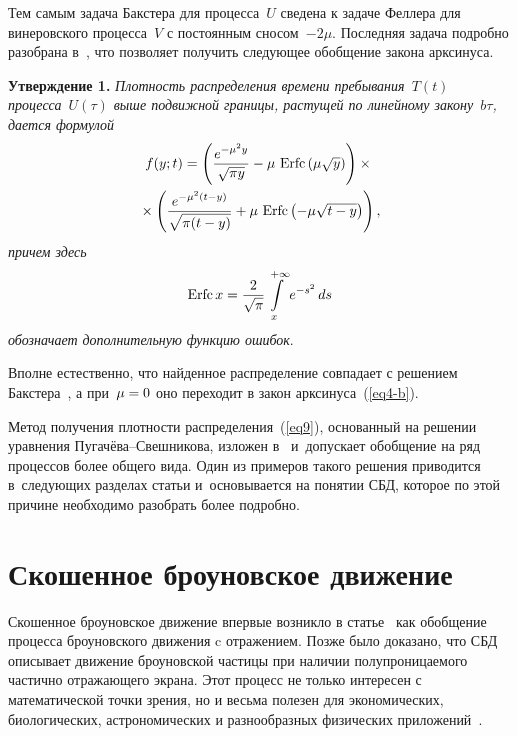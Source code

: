 \begin{multicols}{2}
Тем самым задача Бакстера для процесса~$U$ сведена к задаче Феллера для винеровского процесса~$V$ с постоянным сносом~$-2 \mu$. Последняя задача подробно разобрана в~\cite{ref17}, что позволяет получить следующее обобщение закона арксинуса.

\smallskip

\noindent
\textbf{Утверждение 1.}
\textit{Плотность распределения времени пребывания~$T(t)$ процесса~$U(\tau)$ выше подвижной границы, растущей по линейному закону~$b \tau$, дается формулой
  \begin{multline}
    \label{eq9}
    f(y;t) = \left( \displaystyle\frac{\displaystyle e^{-\mu^2 y}\mathstrut}{\displaystyle \sqrt{\pi y}\mathstrut} - \mu\ \mathrm{Erfc}\left(\mu \sqrt{y}\right) \right)\times{}\\
     {}\times\left( \displaystyle\frac{\displaystyle e^{-\mu^2 (t-y)}\mathstrut}{\displaystyle \sqrt{\pi (t-y)}\mathstrut} + \mu\ \mathrm{Erfc}\left(-\mu \sqrt{t-y}\right) \right),
  \end{multline}
  причем здесь
  \begin{equation*}
    \mathrm{Erfc}\,x = \displaystyle\frac{\displaystyle 2\mathstrut}{\displaystyle \sqrt{\pi}\mathstrut} \int \limits_{x}^{+\infty} e^{-s^2}\, ds
  \end{equation*}
  обозначает дополнительную функцию ошибок}.


\smallskip
Вполне естественно, что найденное распределение совпадает с решением Бакстера~\cite{ref13}, а при~$\mu \hm= 0$ оно переходит в закон арксинуса~(\ref{eq4-b}).

Метод получения плотности распределения~(\ref{eq9}), основанный на решении уравнения Пу\-га\-чё\-ва--Свеш\-ни\-ко\-ва, изложен в~\cite{ref17} и~допускает обобщение на ряд процессов более общего вида. Один из примеров такого решения приводится в~следующих разделах статьи и~основывается на понятии СБД, которое по этой причине необходимо разобрать более подробно.

\section{Скошенное броуновское движение}

\vspace*{-3pt}

Скошенное броуновское движение  впервые возникло в статье~\cite{ref18} как обобщение процесса броуновского движения c отражением. Позже было доказано, что СБД описывает движение броуновской частицы при наличии полупроницаемого частично отражающего экрана. Этот процесс не только интересен с математической точки зрения, но и весьма полезен для экономических, биологических, астрономических и разнообразных физических приложений~\cite{ref19}.


\end{multicols}
